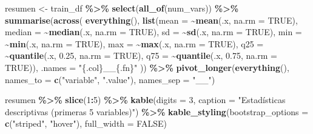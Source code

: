 \documentclass[
]{book}
\newenvironment{Shaded}{\begin{snugshade}}{\end{snugshade}}
\newcommand{\AttributeTok}[1]{\textcolor[rgb]{0.13,0.29,0.53}{#1}}
\newcommand{\ConstantTok}[1]{\textcolor[rgb]{0.56,0.35,0.01}{#1}}
\newcommand{\DecValTok}[1]{\textcolor[rgb]{0.00,0.00,0.81}{#1}}
\newcommand{\FloatTok}[1]{\textcolor[rgb]{0.00,0.00,0.81}{#1}}
\newcommand{\FunctionTok}[1]{\textcolor[rgb]{0.13,0.29,0.53}{\textbf{#1}}}
\newcommand{\NormalTok}[1]{#1}
\newcommand{\OtherTok}[1]{\textcolor[rgb]{0.56,0.35,0.01}{#1}}
\newcommand{\SpecialCharTok}[1]{\textcolor[rgb]{0.81,0.36,0.00}{\textbf{#1}}}
\newcommand{\StringTok}[1]{\textcolor[rgb]{0.31,0.60,0.02}{#1}}
\begin{document}
\begin{Shaded}
\begin{Highlighting}[]
\NormalTok{resumen }\OtherTok{\textless{}{-}}\NormalTok{ train\_df }\SpecialCharTok{\%\textgreater{}\%}
  \FunctionTok{select}\NormalTok{(}\FunctionTok{all\_of}\NormalTok{(num\_vars)) }\SpecialCharTok{\%\textgreater{}\%}
  \FunctionTok{summarise}\NormalTok{(}\FunctionTok{across}\NormalTok{(}
    \FunctionTok{everything}\NormalTok{(),}
    \FunctionTok{list}\NormalTok{(}\AttributeTok{mean =} \SpecialCharTok{\textasciitilde{}}\FunctionTok{mean}\NormalTok{(.x, }\AttributeTok{na.rm =} \ConstantTok{TRUE}\NormalTok{), }\AttributeTok{median =} \SpecialCharTok{\textasciitilde{}}\FunctionTok{median}\NormalTok{(.x, }\AttributeTok{na.rm =} \ConstantTok{TRUE}\NormalTok{),}
         \AttributeTok{sd =} \SpecialCharTok{\textasciitilde{}}\FunctionTok{sd}\NormalTok{(.x, }\AttributeTok{na.rm =} \ConstantTok{TRUE}\NormalTok{), }\AttributeTok{min =} \SpecialCharTok{\textasciitilde{}}\FunctionTok{min}\NormalTok{(.x, }\AttributeTok{na.rm =} \ConstantTok{TRUE}\NormalTok{),}
         \AttributeTok{max =} \SpecialCharTok{\textasciitilde{}}\FunctionTok{max}\NormalTok{(.x, }\AttributeTok{na.rm =} \ConstantTok{TRUE}\NormalTok{), }\AttributeTok{q25 =} \SpecialCharTok{\textasciitilde{}}\FunctionTok{quantile}\NormalTok{(.x, }\FloatTok{0.25}\NormalTok{, }\AttributeTok{na.rm =} \ConstantTok{TRUE}\NormalTok{),}
         \AttributeTok{q75 =} \SpecialCharTok{\textasciitilde{}}\FunctionTok{quantile}\NormalTok{(.x, }\FloatTok{0.75}\NormalTok{, }\AttributeTok{na.rm =} \ConstantTok{TRUE}\NormalTok{)),}
    \AttributeTok{.names =} \StringTok{"\{.col\}\_\_\{.fn\}"}
\NormalTok{  )) }\SpecialCharTok{\%\textgreater{}\%}
  \FunctionTok{pivot\_longer}\NormalTok{(}\FunctionTok{everything}\NormalTok{(), }\AttributeTok{names\_to =} \FunctionTok{c}\NormalTok{(}\StringTok{"variable"}\NormalTok{, }\StringTok{".value"}\NormalTok{),}
               \AttributeTok{names\_sep =} \StringTok{"\_\_"}\NormalTok{)}

\NormalTok{resumen }\SpecialCharTok{\%\textgreater{}\%}
  \FunctionTok{slice}\NormalTok{(}\DecValTok{1}\SpecialCharTok{:}\DecValTok{5}\NormalTok{) }\SpecialCharTok{\%\textgreater{}\%}
  \FunctionTok{kable}\NormalTok{(}\AttributeTok{digits =} \DecValTok{3}\NormalTok{, }\AttributeTok{caption =} \StringTok{"Estadísticas descriptivas (primeras 5 variables)"}\NormalTok{) }\SpecialCharTok{\%\textgreater{}\%}
  \FunctionTok{kable\_styling}\NormalTok{(}\AttributeTok{bootstrap\_options =} \FunctionTok{c}\NormalTok{(}\StringTok{"striped"}\NormalTok{, }\StringTok{"hover"}\NormalTok{), }\AttributeTok{full\_width =} \ConstantTok{FALSE}\NormalTok{)}
\end{Highlighting}
\end{Shaded}
\end{document}
